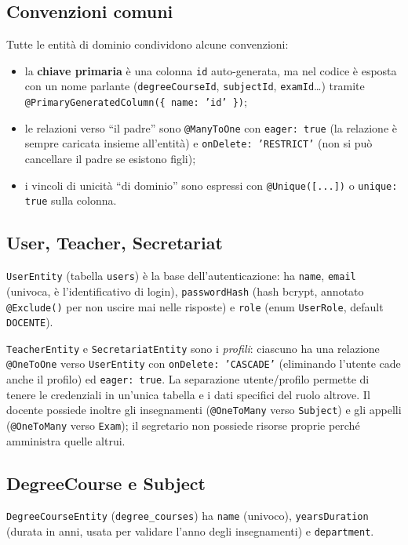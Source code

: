 \documentclass[11pt,a4paper,oneside]{report}
\newcommand{\code}[1]{\texttt{\small #1}}
\begin{document}
\subsection{Convenzioni comuni}
Tutte le entità di dominio condividono alcune convenzioni:

\begin{itemize}[leftmargin=1.4em]
  \item la \textbf{chiave primaria} è una colonna \code{id} auto-generata, ma
        nel codice è esposta con un nome parlante (\code{degreeCourseId},
        \code{subjectId}, \code{examId}\ldots) tramite
        \code{@PrimaryGeneratedColumn(\{ name: 'id' \})};
  \item le relazioni verso ``il padre'' sono \code{@ManyToOne} con
        \code{eager: true} (la relazione è sempre caricata insieme all'entità) e
        \code{onDelete: 'RESTRICT'} (non si può cancellare il padre se esistono
        figli);
  \item i vincoli di unicità ``di dominio'' sono espressi con \code{@Unique([...])}
        o \code{unique: true} sulla colonna.
\end{itemize}

\subsection{User, Teacher, Secretariat}
\code{UserEntity} (tabella \code{users}) è la base dell'autenticazione: ha
\code{name}, \code{email} (univoca, è l'identificativo di login),
\code{passwordHash} (hash bcrypt, annotato \code{@Exclude()} per non uscire mai
nelle risposte) e \code{role} (enum \code{UserRole}, default \code{DOCENTE}).

\code{TeacherEntity} e \code{SecretariatEntity} sono i \emph{profili}: ciascuno
ha una relazione \code{@OneToOne} verso \code{UserEntity} con
\code{onDelete: 'CASCADE'} (eliminando l'utente cade anche il profilo) ed
\code{eager: true}. La separazione utente/profilo permette di tenere le
credenziali in un'unica tabella e i dati specifici del ruolo altrove. Il docente
possiede inoltre gli insegnamenti (\code{@OneToMany} verso \code{Subject}) e gli
appelli (\code{@OneToMany} verso \code{Exam}); il segretario non possiede
risorse proprie perché amministra quelle altrui.

\subsection{DegreeCourse e Subject}
\code{DegreeCourseEntity} (\code{degree\_courses}) ha \code{name} (univoco),
\code{yearsDuration} (durata in anni, usata per validare l'anno degli
insegnamenti) e \code{department}.
\end{document}
